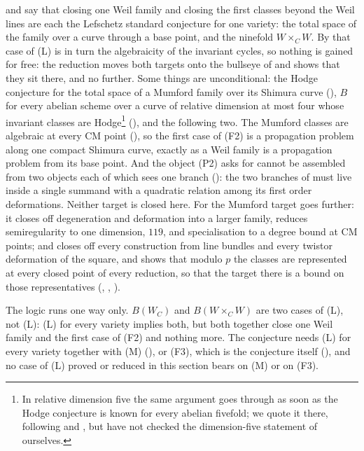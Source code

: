 \begin{remark}\label{rem:targetsstatus}
 and  say that closing one Weil
family and closing the first classes beyond the Weil lines are each the
Lefschetz standard conjecture for one variety: the total space of the family
over a curve through a base point, and the ninefold $W\times_{C}W$. By
 that case of \textup{(L)} is in turn the
algebraicity of the invariant cycles, so nothing is gained for free: the
reduction moves both targets onto the bullseye of  and
shows that they sit there, and no further. Some things are unconditional:
the Hodge conjecture for the total space of a Mumford family over its Shimura
curve (), $B$ for every abelian scheme over a curve
of relative dimension at most four whose invariant classes are
Hodge\footnote{In relative dimension five the same argument goes through as
soon as the Hodge conjecture is known for every abelian fivefold; we quote it
there, following \cite{MZ99} and \cite{Mar25a}, but have not checked the
dimension-five statement of \cite{MZ99} ourselves.}
(), and the following two. The
Mumford classes are algebraic at every CM point (), so the
first case of (F2) is a propagation problem along one compact Shimura curve,
exactly as a Weil family is a propagation problem from its base point. And the
object (P2) asks for cannot be assembled from two objects each of which sees
one branch (): the two branches of  must
live inside a single summand with a quadratic relation among its first order
deformations. Neither target is closed here. For the Mumford target
 goes further: it closes off degeneration and
deformation into a larger family, reduces semiregularity to one dimension,
$119$, and specialisation to a degree bound at CM points; and
 closes off every construction from line bundles and
every twistor deformation of the square, and shows that modulo $p$ the
classes are represented at every closed point of every reduction, so that the
target there is a bound on those representatives (,
, ).

The logic runs one way only. $B(W_{C})$ and $B(W\times_{C}W)$ are two cases of
\textup{(L)}, not \textup{(L)}: \textup{(L)} for every variety implies both,
but both together close one Weil family and the first case of (F2) and
nothing more. The conjecture needs \textup{(L)} for every variety together
with \textup{(M)} (), or (F3), which is the conjecture
itself (), and no case of \textup{(L)} proved or reduced in
this section bears on \textup{(M)} or on (F3).
\end{remark}

